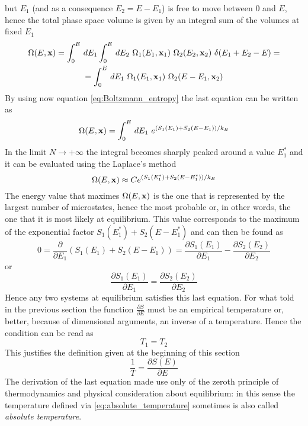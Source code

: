 but $E_1$ (and as a consequence $E_2 = E - E_1$) is free to move between $0$ and $E$, hence the total phase space volume is given by an integral sum of the volumes at fixed $E_1$ \\
\begin{gather*}
    \Omega(E, \mathbf{x}) = \int_0^E \, dE_1 \int_0^E \, dE_2 \ \Omega_1(E_1, \mathbf{x}_1) \ \Omega_2(E_2, \mathbf{x}_2) \ \delta(E_1 + E_2 - E) = \\
    = \int_0^E \, dE_1 \ \Omega_1(E_1, \mathbf{x}_1) \ \Omega_2(E - E_1, \mathbf{x}_2)
\end{gather*}
By using now equation \ref{eq:Boltzmann_entropy} the last equation can be written as 
\begin{equation*}
    \Omega(E, \mathbf{x}) = \int_0^E \, dE_1 \ e^{(S_1(E_1) + S_2(E-E_1))/k_B}
\end{equation*}
In the limit $N \to +\infty$ the integral becomes sharply peaked around a value $E_1^*$ and it can be evaluated using the Laplace's method
\begin{equation*}
    \Omega(E, \mathbf{x}) \approx C e^{(S_1(E_1^*) + S_2(E-E_1^*))/k_B}
\end{equation*}
The energy value that maximes $\Omega(E, \mathbf{x})$ is the one that is represented by the largest number of microstates, hence the most probable or, in other words, the one that it is most likely at equilibrium. This value corresponds to the maximum of the exponential factor $S_1(E_1^*) + S_2(E-E_1^*)$ and can then be found as 
\begin{equation*}
    0 = \frac{\partial}{\partial E_1}(S_1(E_1) + S_2(E-E_1)) = \frac{\partial S_1(E_1)}{\partial E_1} - \frac{\partial S_2(E_2)}{\partial E_2} 
\end{equation*}
or
\begin{equation*}
    \frac{\partial S_1(E_1)}{\partial E_1} = \frac{\partial S_2(E_2)}{\partial E_2} 
\end{equation*}
Hence any two systems at equilibrium satisfies this last equation. For what told in the previous section the function 
$\frac{\partial S}{\partial E}$ must be an empirical temperature or, better, because of dimensional arguments, an inverse of a temperature. Hence the condition can be read as 
\begin{equation*}
    T_1 = T_2
\end{equation*}
This justifies the definition given at the beginning of this section 
\begin{equation}
    \frac{1}{T} = \frac{\partial S(E)}{\partial E}
    \label{eq:absolute_temperature}
\end{equation}
The derivation of the last equation made use only of the zeroth principle of thermodynamics and physical consideration about equilibrium: in this sense the temperature defined via \ref{eq:absolute_temperature} sometimes is also called \emph{absolute temperature}. \\

